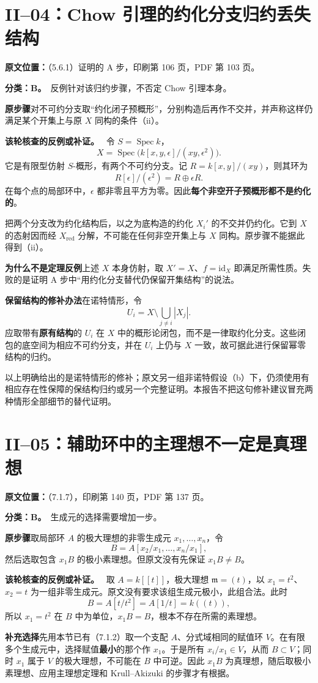 \documentclass[UTF8,a4paper]{ctexbook}
\DeclareMathOperator{\Spec}{Spec}
\newcommand{\red}{\mathrm{red}}
\newcommand{\oldauditsrc}[1]{\par\noindent\textbf{原文位置：}#1。\par}
\newcommand{\kind}[2]{\noindent\textbf{分类：#1。}\ #2\par}
\newcommand{\lead}[1]{\par\noindent\textbf{#1}\quad}
\newenvironment{analysisproof}{\par\noindent\textbf{该轮核查的反例或补证。}\ }{\par}
\begin{document}
\section{II--04：Chow 引理的约化分支归约丢失结构}
\oldauditsrc{（5.6.1）证明的 A 步，印刷第 106 页，PDF 第 103 页}
\kind{B}{反例针对该归约步骤，不否定 Chow 引理本身。}
\lead{原步骤}对不可约分支取“约化闭子预概形”，分别构造后再作不交并，并声称这样仍满足某个开集上与原 $X$ 同构的条件（ii）。
\begin{analysisproof}
令 $S=\Spec k$，
\[
X=\Spec\bigl(k[x,y,\epsilon]/(xy,\epsilon^2)\bigr).
\]
它是有限型仿射 $S$-概形，有两个不可约分支。记 $R=k[x,y]/(xy)$，则其环为
\[
R[\epsilon]/(\epsilon^2)=R\oplus\epsilon R.
\]
在每个点的局部环中，$\epsilon$ 都非零且平方为零。因此\textbf{每个非空开子预概形都不是约化的}。

把两个分支改为约化结构后，以之为底构造的约化 $X_i'$ 的不交并仍约化。它到 $X$ 的态射因而经 $X_{\red}$ 分解，不可能在任何非空开集上与 $X$ 同构。原步骤不能据此得到（ii）。
\end{analysisproof}
\lead{为什么不是定理反例}上述 $X$ 本身仿射，取 $X'=X$、$f=\mathrm{id}_X$ 即满足所需性质。失败的是证明 A 步中“用约化分支替代仍保留开集结构”的说法。
\lead{保留结构的修补办法}在诺特情形，令
\[
U_i=X\setminus\bigcup_{j\ne i}|X_j|.
\]
应取带有\textbf{原有结构}的 $U_i$ 在 $X$ 中的概形论闭包，而不是一律取约化分支。这些闭包的底空间为相应不可约分支，并在 $U_i$ 上仍与 $X$ 一致，故可据此进行保留幂零结构的归约。

以上明确给出的是诺特情形的修补；原文另一组非诺特假设（b）下，仍须使用有相应存在性保障的保结构归约或另一个完整证明。本报告不把这句修补建议冒充两种情形全部细节的替代证明。

\section{II--05：辅助环中的主理想不一定是真理想}
\oldauditsrc{（7.1.7），印刷第 140 页，PDF 第 137 页}
\kind{B}{生成元的选择需要增加一步。}
\lead{原步骤}取局部环 $A$ 的极大理想的非零生成元 $x_1,\ldots,x_n$，令
\[
B=A[x_2/x_1,\ldots,x_n/x_1],
\]
然后选取包含 $x_1B$ 的极小素理想。但原文没有先保证 $x_1B\ne B$。
\begin{analysisproof}
取 $A=k[[t]]$，极大理想 $\mathfrak m=(t)$，以 $x_1=t^2$、$x_2=t$ 为一组非零生成元。原文没有要求该组生成元极小，此组合法。此时
\[
B=A[t/t^2]=A[1/t]=k((t)),
\]
所以 $x_1=t^2$ 在 $B$ 中为单位，$x_1B=B$，根本不存在所需的素理想。
\end{analysisproof}
\lead{补充选择}先用本节已有（7.1.2）取一个支配 $A$、分式域相同的赋值环 $V$。在有限多个生成元中，选择赋值\textbf{最小}的那个作 $x_1$。于是所有 $x_i/x_1\in V$，从而 $B\subset V$；同时 $x_1$ 属于 $V$ 的极大理想，不可能在 $B$ 中可逆。因此 $x_1B$ 为真理想，随后取极小素理想、应用主理想定理和 Krull--Akizuki 的步骤才有根据。
\end{document}
